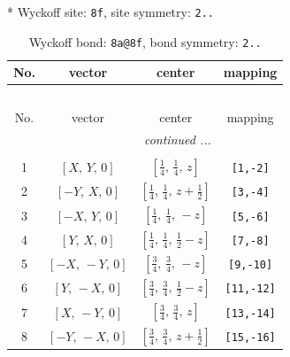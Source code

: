 \documentclass[fleqn,8pt]{jsarticle}
\begin{document}
* Wyckoff site: {\tt 8f}, site symmetry: {\tt 2..}
\renewcommand{\arraystretch}{1.2}
\begin{longtable}{cccc}
\caption{Wyckoff bond: {\tt 8a@8f}, bond symmetry: {\tt 2..}}
 \\
 \hline \hline
No. & vector & center & mapping \\ \hline \endfirsthead

\multicolumn{3}{l}{\tablename\ \thetable{}} \\
 \hline \hline
No. & vector & center & mapping \\ \hline \endhead

 \hline \hline
\multicolumn{3}{r}{\footnotesize\it continued ...} \\ \endfoot

 \hline \hline
\multicolumn{3}{r}{} \\ \endlastfoot

1 & $\left[ X,\, Y,\, 0 \right]$ & $\left[ \frac{1}{4},\, \frac{1}{4},\, z \right]$ & {\tt [1,-2]} \\ \hline
2 & $\left[ - Y,\, X,\, 0 \right]$ & $\left[ \frac{1}{4},\, \frac{1}{4},\, z + \frac{1}{2} \right]$ & {\tt [3,-4]} \\ \hline
3 & $\left[ - X,\, Y,\, 0 \right]$ & $\left[ \frac{1}{4},\, \frac{1}{4},\, - z \right]$ & {\tt [5,-6]} \\ \hline
4 & $\left[ Y,\, X,\, 0 \right]$ & $\left[ \frac{1}{4},\, \frac{1}{4},\, \frac{1}{2} - z \right]$ & {\tt [7,-8]} \\ \hline
5 & $\left[ - X,\, - Y,\, 0 \right]$ & $\left[ \frac{3}{4},\, \frac{3}{4},\, - z \right]$ & {\tt [9,-10]} \\ \hline
6 & $\left[ Y,\, - X,\, 0 \right]$ & $\left[ \frac{3}{4},\, \frac{3}{4},\, \frac{1}{2} - z \right]$ & {\tt [11,-12]} \\ \hline
7 & $\left[ X,\, - Y,\, 0 \right]$ & $\left[ \frac{3}{4},\, \frac{3}{4},\, z \right]$ & {\tt [13,-14]} \\ \hline
8 & $\left[ - Y,\, - X,\, 0 \right]$ & $\left[ \frac{3}{4},\, \frac{3}{4},\, z + \frac{1}{2} \right]$ & {\tt [15,-16]} \\
\end{longtable}
\renewcommand{\arraystretch}{1.2}
\end{document}
